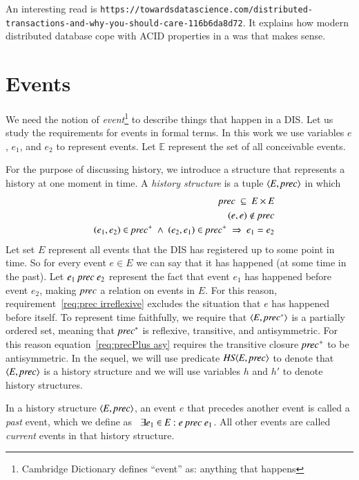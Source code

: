 \documentclass{elsarticle}
\def\id#1{\text{\em #1\/}}
\def\Events{{\mathit E}}
\begin{document}
	An interesting read is {\tt\small https://towardsdatascience.com/distributed-transactions-and-why-you-should-care-116b6da8d72}.
	It explains how modern distributed database cope with ACID properties in a was that makes sense.

\section{Events}
\label{sct:Events}
	We need the notion of {\em event}\footnote{Cambridge Dictionary defines ``event'' as: anything that happens} to describe things that happen in a DIS.
	Let us study the requirements for events in formal terms.
	In this work we use variables $e$, $e_1$, and $e_2$ to represent events.
	Let $\mathbb E$ represent the set of all conceivable events.

	For the purpose of discussing history, we introduce a structure that represents a history at one moment in time.
	A {\em history structure} is a tuple $\la \Events, \id{prec}\ra$ in which
\begin{eqnarray}
	&&\id{prec}\ \subseteq\ \Events\times\Events\label{req:precInE}\\
	&&(e,e)\notin\id{prec}\label{req:prec irreflexive}\\
	&&(e_1,e_2)\in\id{prec}^+\ \wedge\ (e_2,e_1)\in\id{prec}^+\ \Rightarrow\ e_1=e_2\label{req:precPlus asy}
\end{eqnarray}
	Let set $\Events$ represent all events that the DIS has registered up to some point in time.
	So for every event $e\in\Events$ we can say that it has happened (at some time in the past).
	Let $e_1\ \id{prec}\ e_2$ represent the fact that event $e_1$ has happened before event $e_2$,
	making $\id{prec}$ a relation on events in $\Events$.
	For this reason, requirement~\ref{req:prec irreflexive} excludes the situation that $e$ has happened before itself.
	To represent time faithfully, we require that $\la\Events,\id{prec}^*\ra$ is a partially ordered set,
	meaning that $\id{prec}^*$ is reflexive, transitive, and antisymmetric.
	For this reason equation~\ref{req:precPlus asy} requires the transitive closure $\id{prec}^+$ to be antisymmetric.
	In the sequel, we will use predicate $\id{HS}\la \Events, \id{prec}\ra$
	to denote that $\la \Events, \id{prec}\ra$ is a history structure
	and we will use variables $h$ and $h'$ to denote history structures.

	In a history structure $\la \Events, \id{prec}\ra$, an event $e$ that precedes another event is called a {\em past} event,
	which we define as \ $\exists e_1\in\Events: e\ \id{prec}\ e_1$.
	All other events are called {\em current} events in that history structure.
\end{document}
